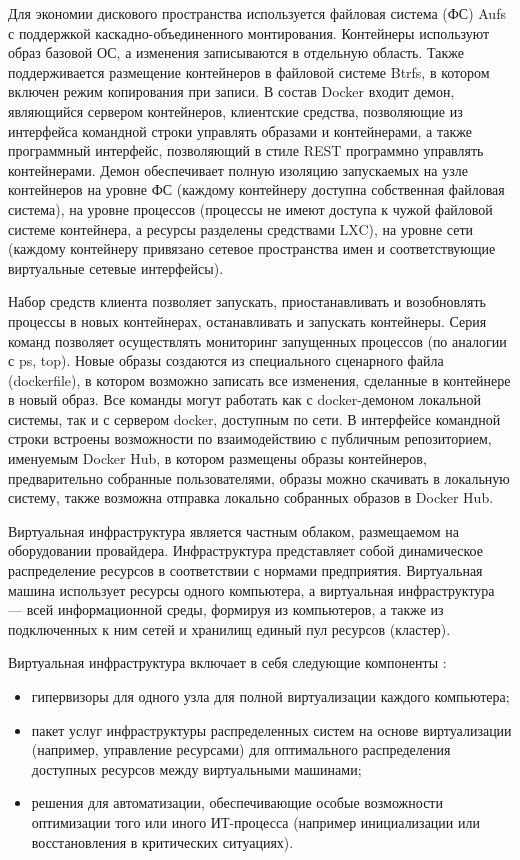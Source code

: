 Для экономии дискового пространства используется файловая система (ФС) Aufs с поддержкой каскадно-объединенного монтирования.
Контейнеры используют образ базовой ОС, а изменения записываются в отдельную область.
Также поддерживается размещение контейнеров в файловой системе Btrfs, в котором включен режим копирования при записи.
В состав Docker входит демон, являющийся сервером контейнеров, клиентские средства, позволяющие из интерфейса командной строки управлять образами и контейнерами, а также программный интерфейс, позволяющий в стиле REST программно управлять контейнерами.
Демон обеспечивает полную изоляцию запускаемых на узле контейнеров на уровне ФС (каждому контейнеру доступна собственная файловая система), на уровне процессов (процессы не имеют доступа к чужой файловой системе контейнера, а ресурсы разделены средствами LXC), на уровне сети (каждому контейнеру привязано сетевое пространства имен и соответствующие виртуальные сетевые интерфейсы).

Набор средств клиента позволяет запускать, приостанавливать и возобновлять процессы в новых контейнерах, останавливать и запускать контейнеры.
Серия команд позволяет осуществлять мониторинг запущенных процессов (по аналогии с ps, top).
Новые образы создаются из специального сценарного файла (dockerfile), в котором возможно записать все изменения, сделанные в контейнере в новый образ.
Все команды могут работать как с docker-демоном локальной системы, так и с сервером docker, доступным по сети.
В интерфейсе командной строки встроены возможности по взаимодействию с публичным репозиторием, именуемым Docker Hub, в котором размещены образы контейнеров, предварительно собранные пользователями, образы можно скачивать в локальную систему, также возможна отправка локально собранных образов в Docker Hub.

Виртуальная инфраструктура является частным облаком, размещаемом на оборудовании провайдера.
Инфраструктура представляет собой динамическое распределение ресурсов в соответствии с нормами предприятия.
Виртуальная машина использует ресурсы одного компьютера, а виртуальная инфраструктура --- всей информационной среды, формируя из компьютеров, а также из подключенных к ним сетей и хранилищ единый пул ресурсов (кластер).

Виртуальная инфраструктура включает в себя следующие компоненты \cite{virt-infrast}:
\begin{itemize}
  \item гипервизоры для одного узла для полной виртуализации каждого компьютера;
  \item пакет услуг инфраструктуры распределенных систем на основе виртуализации (например, управление ресурсами) для оптимального распределения доступных ресурсов между виртуальными машинами;
  \item решения для автоматизации, обеспечивающие особые возможности оптимизации того или иного ИТ-процесса (например инициализации или восстановления в критических ситуациях).
\end{itemize}

